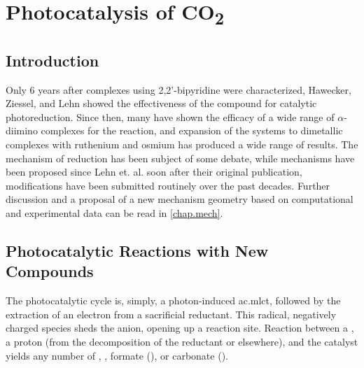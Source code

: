 \chapter{Photocatalysis of \texorpdfstring{CO\textsubscript{2}}{CO2}}

\section{Introduction}

Only 6 years after  complexes using 2,2'-bipyridine were characterized, Hawecker, Ziessel, and Lehn showed the effectiveness of the compound for  catalytic photoreduction\autocite{hawecker1983}. Since then, many have shown the efficacy of a wide range of $\alpha$-diimino complexes for the reaction, and expansion of the systems to dimetallic complexes with ruthenium and osmium has produced a wide range of results. The mechanism of reduction has been subject of some debate, while mechanisms have been proposed since Lehn et. al. soon after their original publication\autocite{hawecker1986}, modifications have been submitted routinely over the past decades. Further discussion and a proposal of a new mechanism geometry based on computational and experimental data can be read in \autoref{chap.mech}.

\section{Photocatalytic Reactions with New Compounds}

The photocatalytic cycle is, simply, a photon-induced \gls{ac.mlct}, followed by the extraction of an electron from a sacrificial reductant. This radical, negatively charged species sheds the anion, opening up a reaction site. Reaction between a , a proton (from the decomposition of the reductant or elsewhere), and the catalyst yields any number of , , formate (), or carbonate (). 


